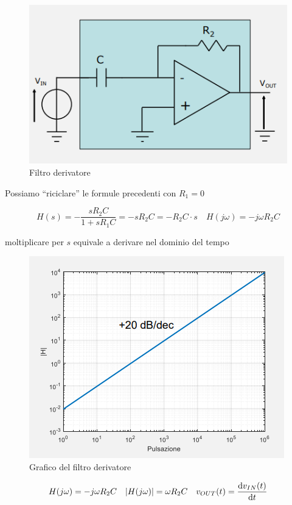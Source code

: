 \documentclass{article}
\begin{document}
\begin{figure}[h]
  \centering
  \includegraphics[scale=0.55]{IM_filtro_derivatore}
  \caption{Filtro derivatore}
  \label{Schema_filtro_derivatore}
\end{figure}

Possiamo ``riciclare'' le formule precedenti con $R_1 = 0$

\[H(s) = - \frac{sR_2 C}{1 + sR_1 C} = - sR_2 C = - R_2 C \cdot s \quad H(j \omega) = - j \omega R_2 C\]

moltiplicare per $s$ equivale a derivare nel dominio del tempo

\begin{figure}[h]
  \centering
  \includegraphics[scale=0.6]{IM_filtro_derivatore_grafici}
  \caption{Grafico del filtro derivatore}
  \label{Schema_filtro_derivatore_grafici}
\end{figure}

\[H(j \omega) = - j \omega R_2 C \quad |H(j \omega)| = \omega R_2 C \quad v_{OUT} (t) = \frac{\textrm d v_{IN} (t)}{\textrm d t}\]
\end{document}
